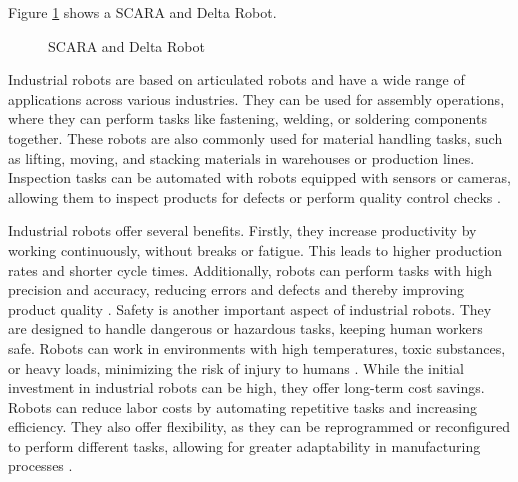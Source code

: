 Figure \ref{fig:ScaraDelta} shows a SCARA and Delta Robot.
\begin{figure}[H]%
	\centering
	\qquad
	\caption{SCARA and Delta Robot}%
	\label{fig:ScaraDelta}%
\end{figure}

Industrial robots are based on articulated robots and have a wide range of applications across various industries. They can be used for assembly operations, where they can perform tasks like fastening, welding, or soldering components together. These robots are also commonly used for material handling tasks, such as lifting, moving, and stacking materials in warehouses or production lines. Inspection tasks can be automated with robots equipped with sensors or cameras, allowing them to inspect products for defects or perform quality control checks \cite{Hagele.2016}.


Industrial robots offer several benefits. Firstly, they increase productivity by working continuously, without breaks or fatigue. This leads to higher production rates and shorter cycle times. Additionally, robots can perform tasks with high precision and accuracy, reducing errors and defects and thereby improving product quality \cite{Kubela.2016}. Safety is another important aspect of industrial robots. They are designed to handle dangerous or hazardous tasks, keeping human workers safe. Robots can work in environments with high temperatures, toxic substances, or heavy loads, minimizing the risk of injury to humans \cite{Heyer.2010}.
While the initial investment in industrial robots can be high, they offer long-term cost savings. Robots can reduce labor costs by automating repetitive tasks and increasing efficiency. They also offer flexibility, as they can be reprogrammed or reconfigured to perform different tasks, allowing for greater adaptability in manufacturing processes \cite{Jung.2020b}.

